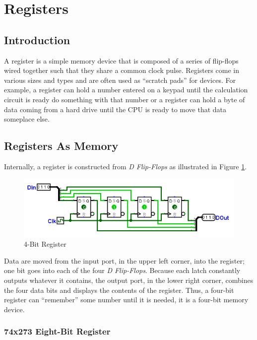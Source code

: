\section{Registers}
\label{SL:sec:registers}

\subsection{Introduction}
\label{SL:subsec:intro_to_registers}

A register is a simple memory device that is composed of a series of flip-flops wired together such that they share a common clock pulse. Registers come in various sizes and types and are often used as ``scratch pads'' for devices. For example, a register can hold a number entered on a keypad until the calculation circuit is ready do something with that number or a register can hold a byte of data coming from a hard drive until the \ac{CPU} is ready to move that data someplace else. 

\subsection{Registers As Memory}
\label{SL:subsec:registers_as_memory}

Internally, a register is constructed from \emph{D Flip-Flops} as illustrated in Figure \ref{fig:09_08}.

\begin{figure}[H]
	\centering
	\includegraphics[width=\maxwidth{.95\linewidth}]{gfx/09_08}
	\caption{4-Bit Register}
	\label{fig:09_08}
\end{figure}

Data are moved from the input port, in the upper left corner, into the register; one bit goes into each of the four \emph{D Flip-Flops}. Because each latch constantly outputs whatever it contains, the output port, in the lower right corner, combines the four data bits and displays the contents of the register. Thus, a four-bit register can ``remember'' some number until it is needed, it is a four-bit memory device.

\subsubsection{74x273 Eight-Bit Register}
\label{SL:subsubsec:74x273_8-bit_register}

